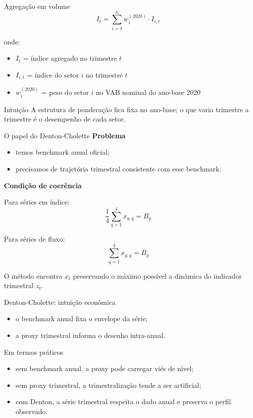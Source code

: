 \documentclass[aspectratio=169,11pt]{beamer}
\begin{document}
\begin{frame}{Agregação em volume}
\[
I_t = \sum_{i=1}^{n} w_i^{(2020)} \cdot I_{i,t}
\]

onde:
\begin{itemize}
  \item \(I_t\) = índice agregado no trimestre \(t\)
  \item \(I_{i,t}\) = índice do setor \(i\) no trimestre \(t\)
  \item \(w_i^{(2020)}\) = peso do setor \(i\) no VAB nominal do ano-base 2020
\end{itemize}

\begin{block}{Intuição}
A estrutura de ponderação fica fixa no ano-base; o que varia trimestre a trimestre é o desempenho de cada setor.
\end{block}
\end{frame}

\begin{frame}{O papel do Denton-Cholette}
\textbf{Problema}
\begin{itemize}
  \item temos benchmark anual oficial;
  \item precisamos de trajetória trimestral consistente com esse benchmark.
\end{itemize}

\vspace{0.2cm}
\textbf{Condição de coerência}

Para séries em índice:
\[
\frac{1}{4}\sum_{q=1}^{4} x_{y,q} = B_y
\]

Para séries de fluxo:
\[
\sum_{q=1}^{4} x_{y,q} = B_y
\]

\vspace{0.2cm}
O método encontra \(x_t\) preservando o máximo possível a dinâmica do indicador trimestral \(z_t\).
\end{frame}

\begin{frame}{Denton-Cholette: intuição econômica}
\begin{itemize}
  \item o benchmark anual fixa o envelope da série;
  \item a proxy trimestral informa o desenho intra-anual.
\end{itemize}

\begin{block}{Em termos práticos}
\begin{itemize}
  \item sem benchmark anual, a proxy pode carregar viés de nível;
  \item sem proxy trimestral, a trimestralização tende a ser artificial;
  \item com Denton, a série trimestral respeita o dado anual e preserva o perfil observado.
\end{itemize}
\end{block}
\end{frame}
\end{document}
